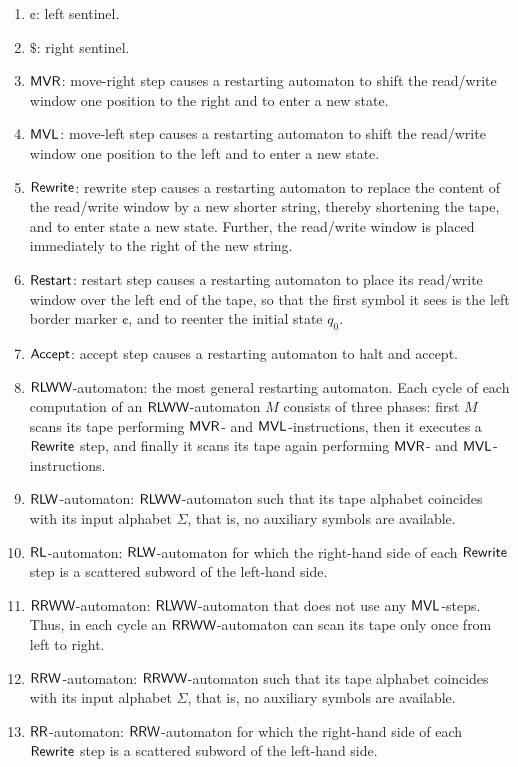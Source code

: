 \begin{enumerate}[]
\item $\cent$: left sentinel.
\item $\$$: right sentinel.
\item $\textup{\sf MVR}$: move-right step causes a restarting automaton to shift the read/write window one position to the right and to enter a new state.
\item $\textup{\sf MVL}$: move-left step causes a restarting automaton to shift the read/write window one position to the left and to enter a new state.
\item $\textup{\sf Rewrite}$: rewrite step causes a restarting automaton to replace the content of the read/write window by a new shorter string, thereby shortening the tape, and to enter state a new state. Further, the read/write window is placed immediately to the right of the new string.
\item $\textup{\sf Restart}$: restart step causes a restarting automaton to place its read/write window over the left end of the tape, so that the first symbol it sees is the left border marker $\cent$, and to reenter the initial state $q_0$.
\item $\textup{\sf Accept}$: accept step causes a restarting automaton to halt and accept.
\item $\textup{\sf RLWW}$-automaton: the most general restarting automaton. Each cycle of each computation of an $\textup{\sf RLWW}$-automaton $M$ consists of three phases: first $M$ scans its tape performing $\textup{\sf MVR}$- and $\textup{\sf MVL}$-instructions, then it executes a $\textup{\sf Rewrite}$ step, and finally it scans its tape again performing $\textup{\sf MVR}$- and $\textup{\sf MVL}$-instructions.
\item $\textup{\sf RLW}$-automaton: $\textup{\sf RLWW}$-automaton such that its tape alphabet coincides with its input alphabet $\Sigma$, that is, no auxiliary symbols are available.
\item $\textup{\sf RL}$-automaton: $\textup{\sf RLW}$-automaton for which the right-hand side of each $\textup{\sf Rewrite}$ step is a scattered subword of the left-hand side.
\item $\textup{\sf RRWW}$-automaton: $\textup{\sf RLWW}$-automaton that does not use any $\textup{\sf MVL}$-steps. Thus, in each cycle an $\textup{\sf RRWW}$-automaton can scan its tape only once from left to right.
\item $\textup{\sf RRW}$-automaton: $\textup{\sf RRWW}$-automaton such that its tape alphabet coincides with its input alphabet $\Sigma$, that is, no auxiliary symbols are available.
\item $\textup{\sf RR}$-automaton: $\textup{\sf RRW}$-automaton for which the right-hand side of each $\textup{\sf Rewrite}$ step is a scattered subword of the left-hand side.

\end{enumerate}
